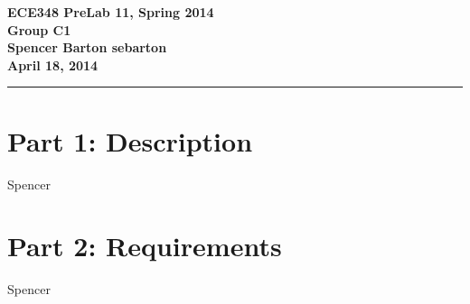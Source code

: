 \documentclass{article}
\newcommand{\assignment}{PreLab 11}
\newcommand{\duedate}{April 18, 2014}
\newcommand{\header}{\noindent \textbf{ECE348 \assignment, Spring 2014 \\
					 Group C1 \\ 
					 Spencer Barton sebarton \\
					 \duedate} \vspace{0.10in} \hrule}
\begin{document}
    

\header


\section*{Part 1: Description}

Spencer

\section*{Part 2: Requirements}

Spencer


		
\end{document}
